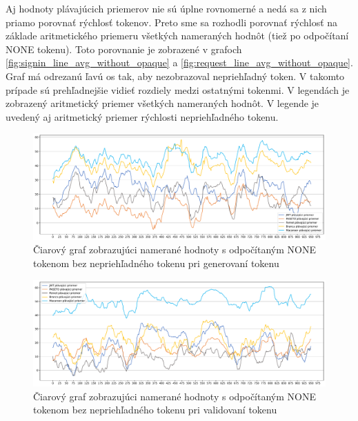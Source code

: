 Aj hodnoty plávajúcich priemerov nie sú úplne rovnomerné a nedá sa z nich priamo porovnať rýchlosť tokenov. Preto sme sa rozhodli porovnať rýchlosť na základe aritmetického priemeru všetkých nameraných hodnôt (tiež po odpočítaní NONE tokenu). Toto porovnanie je zobrazené v grafoch \ref{fig:signin_line_avg_without_opaque} a \ref{fig:request_line_avg_without_opaque}. Graf má odrezanú ľavú os tak, aby nezobrazoval nepriehľadný token. V takomto prípade sú prehľadnejšie vidieť rozdiely medzi ostatnými tokenmi. V legendách je zobrazený aritmetický priemer všetkých nameraných hodnôt. V legende je uvedený aj aritmetický priemer rýchlosti nepriehľadného tokenu.

\begin{figure}[H]
  \centerline{\includegraphics[width=1\textwidth]{images/signin_line_minus_none_without_opaque}}
  \caption[Čiarový graf -- generovanie, odpočítaný NONE token]{Čiarový graf zobrazujúci namerané hodnoty s odpočítaným NONE tokenom bez nepriehľadného tokenu pri generovaní tokenu}
  \label{fig:signin_line_minus_none_without_opaque}
\end{figure}

\begin{figure}[H]
  \centerline{\includegraphics[width=1\textwidth]{images/request_line_minus_none_without_opaque}}
  \caption[Čiarový graf -- validácia, odpočítaný NONE token]{Čiarový graf zobrazujúci namerané hodnoty s odpočítaným NONE tokenom bez nepriehľadného tokenu pri validovaní tokenu}
  \label{fig:request_line_minus_none_without_opaque}
\end{figure}


